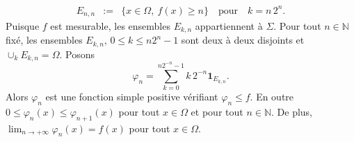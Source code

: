 {\begin{enumerate}
{\begin{eqnarray*}
E_{n, n} &:=& \{x\in\Omega,~ f(x)\geq n\} \quad \text{pour}\quad k
= n\, 2^{n}.
\end{eqnarray*}
Puisque $f$ est mesurable, les ensembles $E_{k, n}$ appartiennent
\`a $\Sigma$. Pour tout $n\in\mathbb{N}$ fix\'e, les ensembles
$E_{k,n}$, $0\leq k\leq n 2^n - 1$ sont deux \`a deux disjoints et
$\cup_{k} E_{k,n} = \Omega$. Posons
$$
\varphi_{n} = \sum_{k=0}^{n 2^{-n}-1} k\, 2^{-n} \mathbf{1}_{E_{k,n}}.
$$
Alors $\varphi_{n}$ est une fonction simple positive v\'erifiant
$\varphi_{n} \leq f$. En outre $0 \leq \varphi_{n}(x) \leq
\varphi_{n+1}(x)$ pour tout $x\in\Omega$ et pour tout
$n\in\mathbb{N}$. De plus,  $\lim_{n\rightarrow +\infty}
\varphi_{n}(x) = f(x)$ pour tout $x\in\Omega$.
}
\end{enumerate}
}
